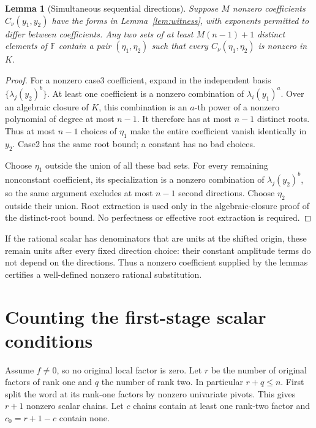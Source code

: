 \documentclass[11pt]{article}
\newtheorem{lemma}[theorem]{Lemma}
\newcommand{\F}{\mathbb F}
\begin{document}
\begin{lemma}[Simultaneous sequential directions]\label{lem:simultaneous}
Suppose \(M\) nonzero coefficients \(C_\nu(y_1,y_2)\) have the forms
in Lemma~\ref{lem:witness}, with exponents permitted to differ
between coefficients. Any two sets of at least \(M(n-1)+1\)
distinct elements of \(\F\) contain a pair \((\eta_1,\eta_2)\)
such that every \(C_\nu(\eta_1,\eta_2)\) is nonzero in \(K\).
\end{lemma}
\begin{proof}
For a nonzero case3 coefficient, expand in the independent basis
\(\{\lambda_j(y_2)^b\}\). At least one coefficient is a nonzero
combination of \(\lambda_i(y_1)^a\).
Over an algebraic closure of \(K\), this combination is an \(a\)-th
power of a nonzero polynomial of degree at most \(n-1\).
It therefore has at most \(n-1\) distinct roots.
Thus at most \(n-1\) choices of \(\eta_1\) make the entire
coefficient vanish identically in \(y_2\).
Case2 has the same root bound; a constant has no bad choices.

Choose \(\eta_1\) outside the union of all these bad sets.
For every remaining nonconstant coefficient, its specialization is
a nonzero combination of \(\lambda_j(y_2)^b\), so the same argument
excludes at most \(n-1\) second directions. Choose \(\eta_2\)
outside their union.
Root extraction is used only in the algebraic-closure proof of
the distinct-root bound. No perfectness or effective root extraction
is required.
\end{proof}

If the rational scalar has denominators that are units at the shifted
origin, these remain units after every fixed direction choice: their
constant amplitude terms do not depend on the directions.
Thus a nonzero coefficient supplied by the lemmas certifies a
well-defined nonzero rational substitution.

\section{Counting the first-stage scalar conditions}

Assume \(f\ne0\), so no original local factor is zero.
Let \(r\) be the number of original factors of rank one and \(q\)
the number of rank two. In particular \(r+q\le n\).
First split the word at its rank-one factors by nonzero univariate
pivots. This gives \(r+1\) nonzero scalar chains.
Let \(c\) chains contain at least one rank-two factor and
\(c_0=r+1-c\) contain none.
\end{document}
